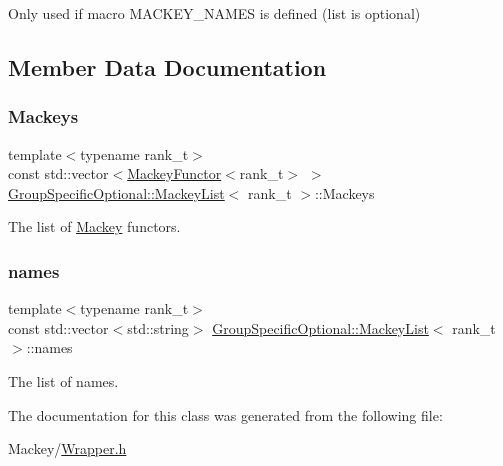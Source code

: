 Only used if macro M\+A\+C\+K\+E\+Y\+\_\+\+N\+A\+M\+ES is defined (list is optional) 

\subsection{Member Data Documentation}
\mbox{\label{classGroupSpecificOptional_1_1MackeyList_aa15b7c7dbcccc2b30442f46aba42b776}} 
\subsubsection{\texorpdfstring{Mackeys}{Mackeys}}
{\footnotesize\ttfamily template$<$typename rank\+\_\+t$>$ \\
const std\+::vector$<$\hyperlink{classMackey_1_1MackeyFunctor}{Mackey\+Functor}$<$rank\+\_\+t$>$ $>$ \hyperlink{classGroupSpecificOptional_1_1MackeyList}{Group\+Specific\+Optional\+::\+Mackey\+List}$<$ rank\+\_\+t $>$\+::Mackeys\hspace{0.3cm}{\ttfamily [static]}}



The list of \hyperlink{namespaceMackey}{Mackey} functors. 

\mbox{\label{classGroupSpecificOptional_1_1MackeyList_a8e25429ed075c31ace2b02bf72f5ef05}} 
\subsubsection{\texorpdfstring{names}{names}}
{\footnotesize\ttfamily template$<$typename rank\+\_\+t$>$ \\
const std\+::vector$<$std\+::string$>$ \hyperlink{classGroupSpecificOptional_1_1MackeyList}{Group\+Specific\+Optional\+::\+Mackey\+List}$<$ rank\+\_\+t $>$\+::names\hspace{0.3cm}{\ttfamily [static]}}



The list of names. 



The documentation for this class was generated from the following file\+:\begin{DoxyCompactItemize}
\item 
Mackey/\hyperlink{Wrapper_8h}{Wrapper.\+h}\end{DoxyCompactItemize}
